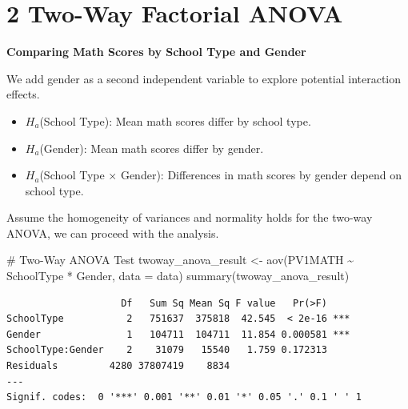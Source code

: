 \documentclass[
  letterpaper,
  DIV=11,
  numbers=noendperiod]{scrreprt}
\newenvironment{Shaded}{\begin{snugshade}}{\end{snugshade}}
\newcommand{\AttributeTok}[1]{\textcolor[rgb]{0.40,0.45,0.13}{#1}}
\newcommand{\CommentTok}[1]{\textcolor[rgb]{0.37,0.37,0.37}{#1}}
\newcommand{\FunctionTok}[1]{\textcolor[rgb]{0.28,0.35,0.67}{#1}}
\newcommand{\NormalTok}[1]{\textcolor[rgb]{0.00,0.23,0.31}{#1}}
\newcommand{\OtherTok}[1]{\textcolor[rgb]{0.00,0.23,0.31}{#1}}
\newcommand{\SpecialCharTok}[1]{\textcolor[rgb]{0.37,0.37,0.37}{#1}}
\begin{document}
\section*{2 Two-Way Factorial ANOVA}\label{two-way-factorial-anova}


\textbf{Comparing Math Scores by School Type and Gender}

We add gender as a second independent variable to explore potential
interaction effects.

\begin{itemize}
\item
  \(H_a\)(School Type): Mean math scores differ by school type.
\item
  \(H_a\)(Gender): Mean math scores differ by gender.
\item
  \(H_a\)(School Type × Gender): Differences in math scores by gender
  depend on school type.
\end{itemize}

Assume the homogeneity of variances and normality holds for the two-way
ANOVA, we can proceed with the analysis.

\begin{Shaded}
\begin{Highlighting}[]
\CommentTok{\# Two{-}Way ANOVA Test }
\NormalTok{twoway\_anova\_result }\OtherTok{\textless{}{-}} \FunctionTok{aov}\NormalTok{(PV1MATH }\SpecialCharTok{\textasciitilde{}}\NormalTok{ SchoolType }\SpecialCharTok{*}\NormalTok{ Gender, }\AttributeTok{data =}\NormalTok{ data) }
\FunctionTok{summary}\NormalTok{(twoway\_anova\_result) }
\end{Highlighting}
\end{Shaded}

\begin{verbatim}
                    Df   Sum Sq Mean Sq F value   Pr(>F)    
SchoolType           2   751637  375818  42.545  < 2e-16 ***
Gender               1   104711  104711  11.854 0.000581 ***
SchoolType:Gender    2    31079   15540   1.759 0.172313    
Residuals         4280 37807419    8834                     
---
Signif. codes:  0 '***' 0.001 '**' 0.01 '*' 0.05 '.' 0.1 ' ' 1
\end{verbatim}
\end{document}
